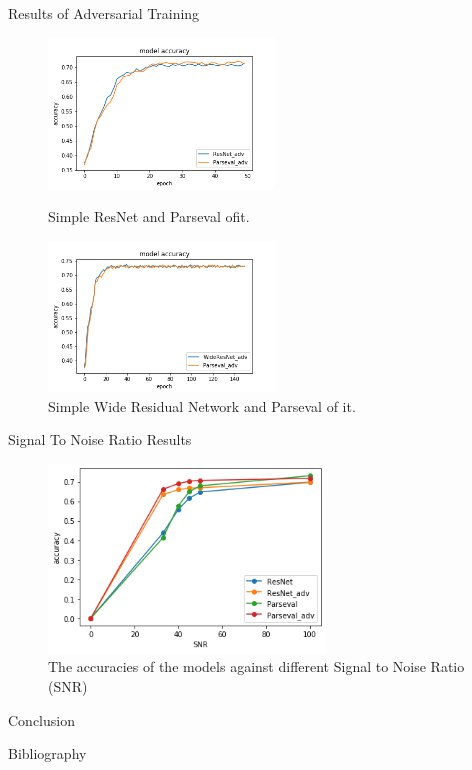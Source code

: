 \documentclass{beamer}		%
\begin{document}
\begin{frame}{Results of Adversarial Training}
\begin{figure}[!htb]
   \begin{minipage}{0.48\textwidth}
     \centering
     \includegraphics[height=4cm,width=.9\linewidth]{compare_ResNetvsParseval_adversarial_accuracy.png}
     \caption{Simple ResNet and Parseval ofit.}\label{Fig:Data1}
   \end{minipage}\hfill
   \begin{minipage}{0.48\textwidth}
     \centering
     \includegraphics[height=4cm,width=.9\linewidth]{compare_ResNetvsParseval_adversarial_for_advanceModel_accuracy.png}
     \caption{Simple Wide Residual Network and Parseval of it.}\label{Fig:Data2}
   \end{minipage}
\end{figure}
\end{frame}
\begin{frame}{Signal To Noise Ratio Results}
\begin{figure}
    \centering
    \includegraphics[height=5cm]{SNR.png}
    \caption{The accuracies of the models against different Signal to Noise Ratio (SNR)}
\end{figure}
\end{frame}

\begin{frame}{Conclusion}

\end{frame}



\begin{frame}{Bibliography}
\;

\end{frame}
\end{document}
